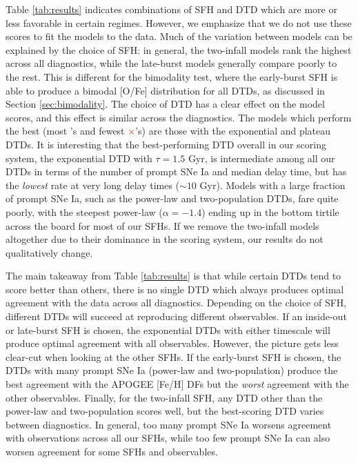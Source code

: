 \documentclass[twocolumn,twocolappendix,linenumbers,trackchanges]{aastex631}
\newcommand{\yes}{\textcolor{green}{\checkmark}\xspace}
\newcommand{\no}{\textcolor{red}{$\times$}\xspace}
\begin{document}
Table \ref{tab:results} indicates combinations of SFH and DTD which are more or less favorable in certain regimes. However, we emphasize that we do not use these scores to fit the models to the data. Much of the variation between models can be explained by the choice of SFH: in general, the two-infall models rank the highest across all diagnostics, while the late-burst models generally compare poorly to the rest. This is different for the bimodality test, where the early-burst SFH is able to produce a bimodal [O/Fe] distribution for all DTDs, as discussed in Section \ref{sec:bimodality}. The choice of DTD has a clear effect on the model scores, and this effect is similar across the diagnostics. The models which perform the best (most \yes's and fewest \no's) are those with the exponential and plateau DTDs. It is interesting that the best-performing DTD overall in our scoring system, the exponential DTD with $\tau=1.5$ Gyr, is intermediate among all our DTDs in terms of the number of prompt SNe Ia and median delay time, but has the {\it lowest} rate at very long delay times ($\sim10$ Gyr). Models with a large fraction of prompt SNe Ia, such as the power-law and two-population DTDs, fare quite poorly, with the steepest power-law ($\alpha=-1.4$) ending up in the bottom tirtile across the board for most of our SFHs. If we remove the two-infall models altogether due to their dominance in the scoring system, our results do not qualitatively change.

The main takeaway from Table \ref{tab:results} is that while certain DTDs tend to score better than others, there is no single DTD which always produces optimal agreement with the data across all diagnostics. Depending on the choice of SFH, different DTDs will succeed at reproducing different observables. If an inside-out or late-burst SFH is chosen, the exponential DTDs with either timescale will produce optimal agreement with all observables. However, the picture gets less clear-cut when looking at the other SFHs. If the early-burst SFH is chosen, the DTDs with many prompt SNe Ia (power-law and two-population) produce the best agreement with the APOGEE [Fe/H] DFs but the {\it worst} agreement with the other observables. Finally, for the two-infall SFH, any DTD other than the power-law and two-population scores well, but the best-scoring DTD varies between diagnostics. In general, too many prompt SNe Ia worsens agreement with observations across all our SFHs, while too few prompt SNe Ia can also worsen agreement for some SFHs and observables.
\end{document}
